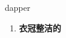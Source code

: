 
\begin{frame}
{\huge dapper}
\begin{center}
\begin{enumerate}\Large
  \item \textbf{衣冠整洁的}
\end{enumerate}
\end{center}
\end{frame}
